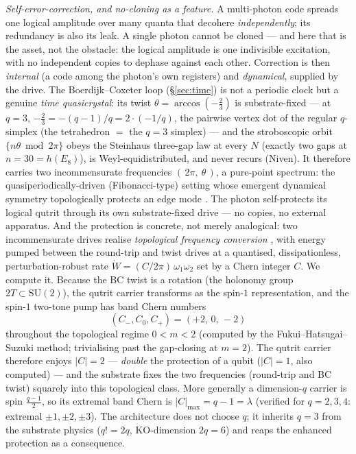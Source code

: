 \documentclass[11pt]{article}
\begin{document}
\emph{Self-error-correction, and no-cloning as a feature.} A multi-photon code
spreads one logical amplitude over many quanta that decohere \emph{independently};
its redundancy is also its leak. A single photon cannot be cloned --- and here
that is the asset, not the obstacle: the logical amplitude is one indivisible
excitation, with no independent copies to dephase against each other. Correction
is then \emph{internal} (a code among the photon's own registers) and
\emph{dynamical}, supplied by the drive. The Boerdijk--Coxeter loop
(\S\ref{sec:time}) is not a periodic clock but a genuine \emph{time quasicrystal}:
its twist $\theta=\arccos(-\tfrac23)$ is substrate-fixed --- at $q=3$,
$-\tfrac23=-(q-1)/q=2\cdot(-1/q)$, the pairwise vertex dot of the regular
$q$-simplex (the tetrahedron $=$ the $q{=}3$ simplex) --- and the stroboscopic
orbit $\{n\theta \bmod 2\pi\}$ obeys the Steinhaus three-gap law at every $N$
(exactly two gaps at $n=30=h(E_8)$), is Weyl-equidistributed, and never recurs
(Niven). It therefore carries two incommensurate frequencies
$(\,2\pi,\ \theta\,)$, a pure-point spectrum: the quasiperiodically-driven
(Fibonacci-type) setting whose emergent dynamical symmetry topologically protects
an edge mode \cite{dvp-fibonacci,dumitrescu}. The photon self-protects its logical qutrit
through its own substrate-fixed drive --- no copies, no external apparatus. And
the protection is concrete, not merely analogical: two incommensurate drives
realise \emph{topological frequency conversion} \cite{mrh-pump}, with energy
pumped between the round-trip and twist drives at a quantised, dissipationless,
perturbation-robust rate $\dot W=(C/2\pi)\,\omega_1\omega_2$ set by a Chern
integer $C$. We compute it. Because the BC twist is a rotation (the holonomy
group $2T\subset\mathrm{SU}(2)$), the qutrit carrier transforms as the spin-$1$
representation, and the spin-$1$ two-tone pump has band Chern numbers
\[
  (C_-,C_0,C_+)=(+2,\,0,\,-2)
\]
throughout the topological regime $0<m<2$ (computed by the
Fukui--Hatsugai--Suzuki method; trivialising past the gap-closing at $m=2$). The
qutrit carrier therefore enjoys $|C|=2$ --- \emph{double} the protection of a
qubit ($|C|=1$, also computed) --- and the substrate fixes the two frequencies
(round-trip and BC twist) squarely into this topological class. More generally a
dimension-$q$ carrier is spin $\tfrac{q-1}{2}$, so its extremal band Chern is
$|C|_{\max}=q-1=\lambda$ (verified for $q=2,3,4$: extremal $\pm1,\pm2,\pm3$). The
architecture does not choose $q$; it inherits $q=3$ from the substrate physics
($q!=2q$, KO-dimension $2q=6$) and reaps the enhanced protection as a consequence.
\end{document}
